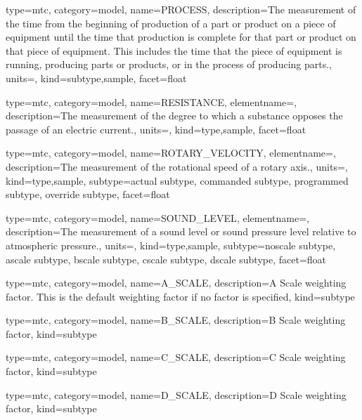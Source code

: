 {
  type=mtc,
  category=model,
  name={PROCESS},
  description={The measurement of the time from the beginning of production of a part or product on a piece of equipment until the time that production is complete for that part or product on that piece of equipment.  This includes the time that the piece of equipment is running, producing parts or products, or in the process of producing parts.},
  units=,
  kind={subtype,sample},
  facet={\gls{float}}
}


{
  type=mtc,
  category=model,
  name={RESISTANCE},
  elementname=,
  description={The measurement of the degree to which a substance opposes the passage of an electric current.},
  units=,
  kind={type,sample},
  facet={\gls{float}}
}


{
  type=mtc,
  category=model,
  name={ROTARY\_VELOCITY},
  elementname=,
  description={The measurement of the rotational speed of a rotary axis.},
  units=,
  kind={type,sample},
  subtype={\gls{actual subtype}, \gls{commanded subtype}, \gls{programmed subtype}, \gls{override subtype}},
  facet={\gls{float}}
}



{
  type=mtc,
  category=model,
  name={SOUND\_LEVEL},
  elementname=,
  description={The measurement of a sound level or sound pressure level relative to atmospheric pressure.},
  units=,
  kind={type,sample},
  subtype={\gls{noscale subtype}, \gls{ascale subtype}, \gls{bscale subtype}, \gls{cscale subtype}, \gls{dscale subtype}},
  facet={\gls{float}}
}


{
  type=mtc,
  category=model,
  name={A\_SCALE},
  description={A Scale weighting factor.   This is the default weighting factor if no factor is specified},
  kind={subtype}
}


{
  type=mtc,
  category=model,
  name={B\_SCALE},
  description={B Scale weighting factor},
  kind={subtype}
}


{
  type=mtc,
  category=model,
  name={C\_SCALE},
  description={C Scale weighting factor},
  kind={subtype}
}


{
  type=mtc,
  category=model,
  name={D\_SCALE},
  description={D Scale weighting factor},
  kind={subtype}
}


